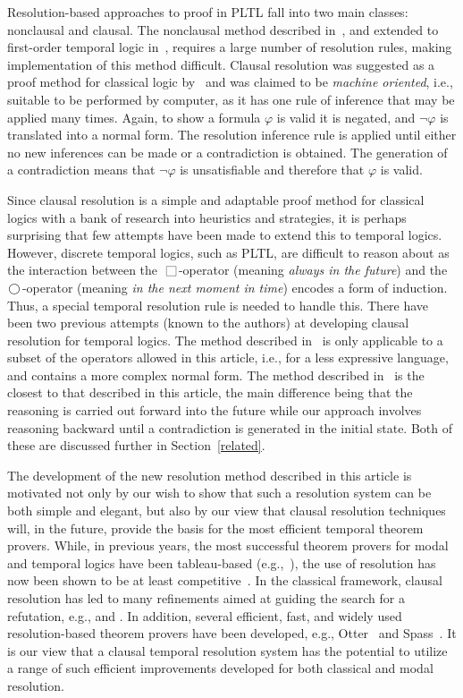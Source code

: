 \documentclass[nohyperref]{acmtrans2f}
\newcommand{\always}{\raisebox{-.2ex}{
                           \mbox{\unitlength=0.9ex
                           \begin{picture}(2,2)
                           \linethickness{0.06ex}
                           \put(0,0){\line(1,0){2}}
                           \put(0,2){\line(1,0){2}}
                           \put(0,0){\line(0,1){2}}
                           \put(2,0){\line(0,1){2}}
                           \end{picture}}}
                          \,}
\newcommand{\next}{\!\raisebox{-.2ex}{ %
                        \mbox{\unitlength=0.9ex
                        \begin{picture}(2,2)
                        \linethickness{0.06ex}
                        \put(1,1){\circle{2}} %
                        \end{picture}}}       %
                        \,}
\begin{document}
Resolution-based approaches to proof in PLTL fall into two main
classes: nonclausal and clausal. The nonclausal method described
in~, and extended to first-order temporal logic
in~, requires a large number of resolution rules,
making implementation of this method difficult. Clausal resolution was
suggested as a proof method for classical logic by~ and was
claimed to be {\em machine oriented}, 
i.e., suitable to be performed by computer, as it has one rule of
inference that may be applied many times. Again, to show a formula
$\varphi$ is valid it is negated, and $\neg \varphi$ is translated
into a normal form. The resolution inference rule is applied until
either no new inferences can be made or a contradiction is
obtained. The generation of a contradiction means that $\neg \varphi$
is unsatisfiable and therefore that $\varphi$ is valid.

Since clausal resolution is a simple and adaptable proof method for
classical logics with a bank of research into heuristics and
strategies, it is perhaps surprising that few attempts have been made
to extend this to temporal logics. However, discrete temporal logics,
such as PLTL, are difficult to reason about as the interaction between
the $\always$-operator (meaning {\em always in the future}) and the
$\next$-operator (meaning {\em in the next moment in time}) encodes a
form of induction. Thus, a special temporal resolution rule is 
needed to handle this. There have been two previous attempts (known to
the authors) at developing clausal resolution for temporal logics. The
method described in~ is only applicable to a subset of
the operators allowed in this article, i.e., for a less expressive
language, and contains a more complex normal form. The method
described in~ is the closest to that described in this
article, the main difference being that the reasoning is carried out
forward into the future while our approach involves reasoning
backward until a contradiction is generated in the initial
state. Both of these are discussed further in Section~\ref{related}.

The development of the new resolution method described in this article
is motivated not only by our wish to show that such a resolution
system can be both simple and elegant, but also by our view that
clausal resolution techniques will, in the future, provide the basis
for the most efficient temporal theorem provers. While, in previous
years, the most successful theorem provers for modal and temporal
logics have been tableau-based (e.g.,~), the use of
resolution has now been shown to be at least
competitive~\cite{HustadtSchmidt99c}. In the classical framework,
clausal resolution has led to many refinements aimed at guiding the
search for a refutation, e.g.,
 and .
In
addition, several efficient, fast, and widely used resolution-based
theorem provers have been developed, e.g., {\sc
Otter}~\cite{Otter3.0} and {\sc Spass}~\cite{Weidenbach97}. It is our
view that a clausal temporal resolution system has the potential to
utilize a range of such efficient improvements developed for both
classical and modal resolution.
\end{document}
